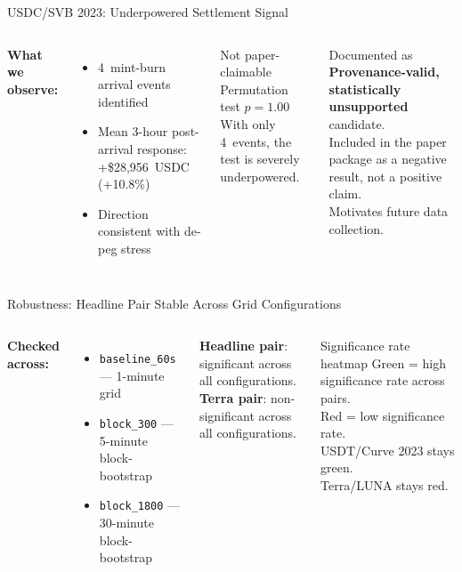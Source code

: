 \documentclass[aspectratio=169,11pt]{beamer}
\begin{document}
\begin{frame}{USDC/SVB 2023: Underpowered Settlement Signal}
\begin{columns}[T]
\textbf{What we observe:}
\begin{itemize}
  \item 4~mint-burn arrival events identified
  \item Mean 3-hour post-arrival response: +\$28,956~USDC (+10.8\%)
  \item Direction consistent with de-peg stress
\end{itemize}
\vspace{6pt}
\begin{alertblock}{Not paper-claimable}
Permutation test $p = 1.00$\\
With only 4~events, the test is severely underpowered.
\end{alertblock}
\begin{block}{Documented as}
\textbf{Provenance-valid, statistically unsupported} candidate.\\[6pt]
Included in the paper package as a negative result, not a positive claim.\\[6pt]
Motivates future data collection.
\end{block}
\end{columns}
\end{frame}


\begin{frame}{Robustness: Headline Pair Stable Across Grid Configurations}
\begin{columns}[T]
\textbf{Checked across:}
\begin{itemize}
  \item \texttt{baseline\_60s} --- 1-minute grid
  \item \texttt{block\_300} --- 5-minute block-bootstrap
  \item \texttt{block\_1800} --- 30-minute block-bootstrap
\end{itemize}
\vspace{6pt}
\textbf{Headline pair}: significant across all configurations.\\[4pt]
\textbf{Terra pair}: non-significant across all configurations.
\begin{block}{Significance rate heatmap}
Green = high significance rate across pairs.\\
Red = low significance rate.\\[4pt]
USDT/Curve 2023 stays green.\\
Terra/LUNA stays red.
\end{block}
\end{columns}
\end{frame}
\end{document}
